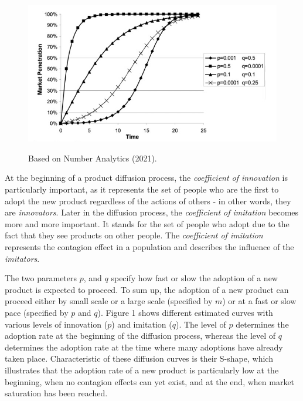 \documentclass{article}
\begin{document}
\begin{figure}[hptb]
    \centering{}\includegraphics[scale=0.45]{plots/bass_model_example.png}\\
    \caption{Based on Number Analytics (2021).}
\end{figure}

\noindent At the beginning of a product diffusion process, the \emph{coefficient of innovation} is particularly important, as it represents the set of
people who are the first to adopt the new product regardless of the actions of others - in other words, they are \emph{innovators}. Later in the diffusion
process, the \emph{coefficient of imitation} becomes more and more important. It stands for the set of people who adopt due to the fact that they see
products on other people. The \emph{coefficient of imitation} represents the contagion effect in a population and describes the influence of the \emph{imitators}.

\medskip

\noindent The two parameters $p$, and $q$ specify how fast or slow the adoption of a new product is expected to proceed. To sum up, the adoption of a
new product can proceed either by small scale or a large scale (specified by $m$) or at a fast or slow pace (specified by $p$ and $q$). 
Figure 1 shows different estimated curves with various levels of innovation ($p$) and imitation ($q$). The level of $p$ determines the adoption rate at
the beginning of the diffusion process, whereas the level of $q$ determines the adoption rate at the time where many adoptions have already taken place.
Characteristic of these diffusion curves is their S-shape, which illustrates that the adoption rate of a new product is particularly low at the beginning,
when no contagion effects can yet exist, and at the end, when market saturation has been reached. 
\end{document}
